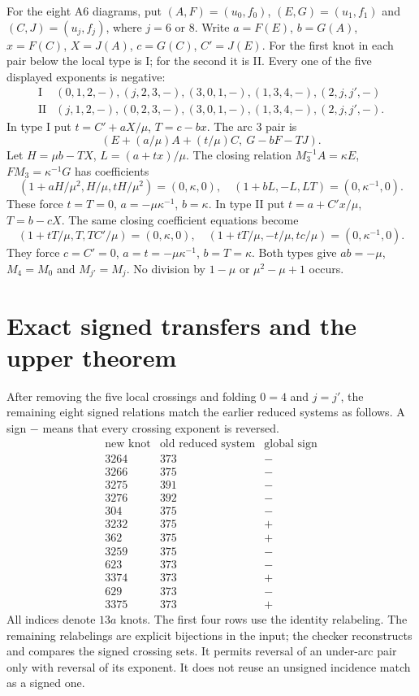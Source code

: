 \documentclass[11pt]{article}
\begin{document}
For the eight A6 diagrams, put $(A,F)=(u_0,f_0)$,
$(E,G)=(u_1,f_1)$ and $(C,J)=(u_j,f_j)$, where $j=6$ or $8$.
Write $a=F(E)$, $b=G(A)$, $x=F(C)$, $X=J(A)$,
$c=G(C)$, $C'=J(E)$.
For the first knot in each pair below the local type is I; for the
second it is II. Every one of the five displayed exponents is negative:
\[
\begin{array}{c|l}
\mathrm I&(0,1,2,-),(j,2,3,-),(3,0,1,-),(1,3,4,-),(2,j,j',-)\\
\mathrm {II}&(j,1,2,-),(0,2,3,-),(3,0,1,-),(1,3,4,-),(2,j,j',-).
\end{array}
\]
In type I put $t=C'+aX/\mu$, $T=c-bx$.
The arc $3$ pair is
\[
 (E+(a/\mu)A+(t/\mu)C,\ G-bF-TJ).
\]
Let $H=\mu b-TX$, $L=(a+tx)/\mu$.
The closing relation $M_3^{-1}A=\kappa E$,
$FM_3=\kappa^{-1}G$ has coefficients
\[
 (1+aH/\mu^2,H/\mu,tH/\mu^2)=(0,\kappa,0),\quad
 (1+bL,-L,LT)=(0,\kappa^{-1},0).
\]
These force $t=T=0$, $a=-\mu\kappa^{-1}$, $b=\kappa$.
In type II put $t=a+C'x/\mu$, $T=b-cX$.
The same closing coefficient equations become
\[
 (1+tT/\mu,T,TC'/\mu)=(0,\kappa,0),\quad
 (1+tT/\mu,-t/\mu,tc/\mu)=(0,\kappa^{-1},0).
\]
They force $c=C'=0$, $a=t=-\mu\kappa^{-1}$, $b=T=\kappa$.
Both types give $ab=-\mu$, $M_4=M_0$ and $M_{j'}=M_j$.
No division by $1-\mu$ or $\mu^2-\mu+1$ occurs.

\section{Exact signed transfers and the upper theorem}

After removing the five local crossings and folding $0=4$ and $j=j'$,
the remaining eight signed relations match the earlier reduced systems
as follows. A sign $-$ means that every crossing exponent is reversed.
\[
\begin{array}{c|c|r}
\text{new knot}&\text{old reduced system}&\text{global sign}\\\hline
3264&373&-\\3266&375&-\\3275&391&-\\3276&392&-\\
304&375&-\\3232&375&+\\362&375&+\\3259&375&-\\
623&373&-\\3374&373&+\\629&373&-\\3375&373&+
\end{array}
\]
All indices denote $13a$ knots. The first four rows use the identity
relabeling. The remaining relabelings are explicit bijections in the
input; the checker reconstructs and compares the signed crossing sets.
It permits reversal of an under-arc pair only with reversal of its
exponent. It does not reuse an unsigned incidence match as a signed one.
\end{document}
